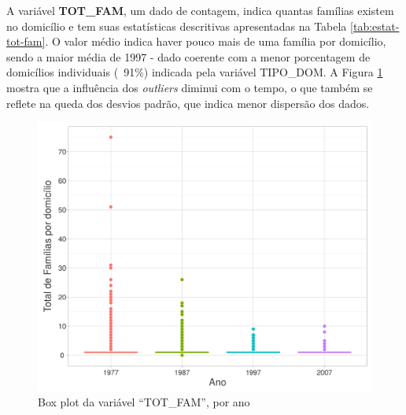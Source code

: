 A variável \textbf{TOT_FAM}, um dado de contagem, indica quantas famílias existem no domicílio e tem suas estatísticas descritivas apresentadas na Tabela \ref{tab:estat-tot-fam}. O valor médio indica haver pouco mais de uma família por domicílio, sendo a maior média de 1997 - dado coerente com a menor porcentagem de domicílios individuais (~91\%) indicada pela variável TIPO_DOM. A Figura \ref{fig:box-plot-tot-fam} mostra que a influência dos \textit{outliers} diminui com o tempo, o que também se reflete na queda dos desvios padrão, que indica menor dispersão dos dados.


\begin{figure}[htb]%
    \caption{\label{fig:box-plot-tot-fam}Box plot da variável ``TOT_FAM'', por ano}%
    \begin{center}%
        \includegraphics[width=1\textwidth]{./imagens/box-plot-tot-fam.png}%
    \end{center}%
\end{figure}%

